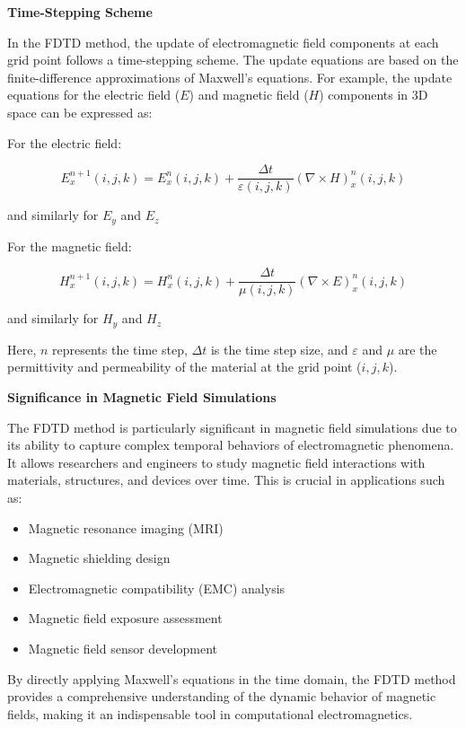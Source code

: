 \documentclass[11pt, a4paper, titlepage]{article}
\begin{document}
\textbf{Time-Stepping Scheme}

In the FDTD method, the update of electromagnetic field components at each grid point follows a time-stepping scheme. The update equations are based on the finite-difference approximations of Maxwell's equations. For example, the update equations for the electric field (\(E\)) and magnetic field (\(H\)) components in 3D space can be expressed as:

\begin{center} For the electric field: \end{center}
\[
E_x^{n+1}(i,j,k) = E_x^n(i,j,k) + \frac{\Delta t}{\varepsilon(i,j,k)} \left(\nabla \times H\right)_x^n(i,j,k)
\]
\begin{center}and similarly for  $E_y$ and $E_z$\end{center}



\begin{center}For the magnetic field:\end{center}
\[
H_x^{n+1}(i,j,k) = H_x^n(i,j,k) + \frac{\Delta t}{\mu(i,j,k)} \left(\nabla \times E\right)_x^n(i,j,k)
\]
 \begin{center}and similarly for $H_y$ and $H_z$\end{center}
 
 
Here, \(n\) represents the time step, \(\Delta t\) is the time step size, and \(\varepsilon\) and \(\mu\) are the permittivity and permeability of the material at the grid point (\(i, j, k\)).

\textbf{Significance in Magnetic Field Simulations}

The FDTD method is particularly significant in magnetic field simulations due to its ability to capture complex temporal behaviors of electromagnetic phenomena. It allows researchers and engineers to study magnetic field interactions with materials, structures, and devices over time. This is crucial in applications such as:
\begin{itemize}
	\item Magnetic resonance imaging (MRI)
	\item Magnetic shielding design
	\item Electromagnetic compatibility (EMC) analysis
	\item Magnetic field exposure assessment
	\item Magnetic field sensor development
\end{itemize}

By directly applying Maxwell's equations in the time domain, the FDTD method provides a comprehensive understanding of the dynamic behavior of magnetic fields, making it an indispensable tool in computational electromagnetics.
\end{document}
